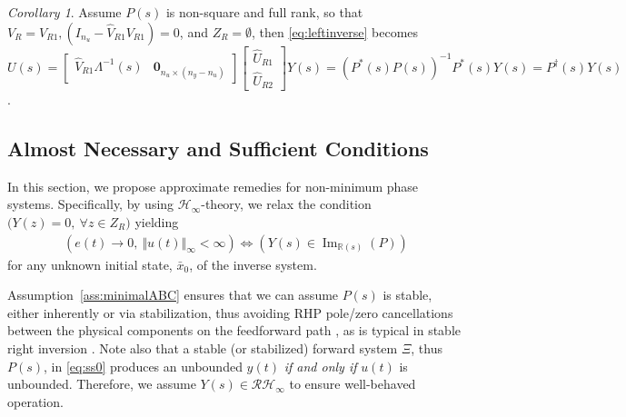 \documentclass[journal]{IEEEtran}
\theoremstyle{remark}
\newtheorem{corollary}{Corollary}
\DeclareMathOperator*{\im}{Im}
\begin{document}
\begin{corollary} \label{coro:min_phase_left_pseudo_inverses}
Assume $P(s)$ is non-square and full rank, so that $V_{R}=V_{R1}, (I_{n_u}-\hat{V}_{R1}{V}_{R1})=0$, and $ Z_R = \emptyset$, then \eqref{eq:leftinverse} becomes $U(s) = \begin{bmatrix}
    \hat{V}_{R1}\Lambda^{-1}(s) &
   \textbf{0}_{n_u \times (n_y-n_u)}
\end{bmatrix}
\begin{bmatrix}
    \hat{U}_{R1} \\
    \hat{U}_{R2}
\end{bmatrix}Y(s)
= (P^*(s)P(s))^{-1}P^*(s)Y(s) = P^\dagger(s)Y(s)$.

\end{corollary}
\subsection{Almost Necessary and Sufficient Conditions}\label{sec:almostiff}
In this section, we propose approximate remedies for non-minimum phase systems. Specifically, by using \(\mathcal{H}_\infty\)-theory, we relax the condition 
\(\bigl(Y(z) = 0,\ \forall z \in Z_R\bigr)\) 
yielding 
\begin{align*}
   ( e(t)\to 0, \ \Vert u(t) \Vert_\infty < \infty ) \iff  ( Y(s) \in \im_{\mathbb{R}(s)}(P) )
    \end{align*}
for any unknown initial state, \(\bar{x}_0\), of the inverse system.

Assumption~\ref{ass:minimalABC} ensures that we can assume $P(s)$ is stable, either inherently or via stabilization, thus avoiding RHP pole/zero cancellations between the physical components on the feedforward path \cite[Section 4.7.1]{skogestad2005multivariable}, as is typical in stable right inversion \cite{romagnoli2019general, devasia2002should}. Note also that a stable (or stabilized) forward system $\Xi$, thus $P(s)$, in \eqref{eq:ss0} produces an unbounded $y(t)$ \textit{if and only if} $u(t)$ is unbounded. Therefore, we assume \(Y(s) \in \mathcal{RH}_\infty\) to ensure well-behaved operation.
\end{document}
